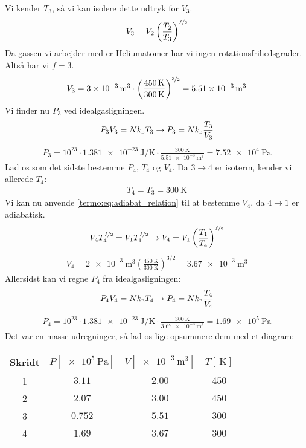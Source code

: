 \documentclass[crop=false, class=memoir]{standalone}
\begin{document}
Vi kender $T_3$, så vi kan isolere dette udtryk for $V_3$.
\begin{align}
    V_3 = V_2 \left( \frac{T_2}{T_3} \right)^{\nicefrac{f}{2}}
\end{align}
Da gassen vi arbejder med er Heliumatomer har vi ingen rotationsfrihedsgrader. Altså har vi $f = 3$.
\begin{align}
    V_3 = \SI{3e-3}{\cubic \meter} \cdot \left( \frac{\SI{450}{\kelvin}}{\SI{300}{\kelvin}} \right)^{\nicefrac{3}{2}} = \SI{5.51e-3}{\cubic \meter}
\end{align}
Vi finder nu $P_3$ ved idealgasligningen.
\begin{align}
    P_3 V_3 = N k_\textsc{b} T_3 \rightarrow P_3 = Nk_\textsc{b} \frac{T_3}{V_3}
\end{align}
\begin{align}
    P_3 = 10^{23} \cdot \SI{1.381e-23}{\joule \per \kelvin} \cdot \frac{\SI{300}{\kelvin}}{\SI{5.51e-3}{\cubic \meter}} = \SI{7.52e4}{\pascal}
\end{align}
Lad os som det sidste bestemme $P_4$, $T_4$ og $V_4$. Da $3\rightarrow 4$ er isoterm, kender vi allerede $T_4$:
\begin{align}
    T_4 = T_3 = \SI{300}{\kelvin}
\end{align}
Vi kan nu anvende \cref{termo:eq:adiabat_relation} til at bestemme $V_4$, da $4 \rightarrow 1$ er adiabatisk.
\begin{align}
    V_4 T_4^{\nicefrac{f}{2}} = V_1 T_1^{\nicefrac{f}{2}} \rightarrow V_4 = V_1 \left( \frac{T_1}{T_4} \right)^{\nicefrac{f}{2}}
\end{align}
\begin{align}
    V_4 = \SI{2e-3}{\cubic \meter} \left( \frac{\SI{450}{\kelvin}}{\SI{300}{\kelvin}} \right)^{3/2} = \SI{3.67e-3}{\cubic \meter}
\end{align}
Allersidst kan vi regne $P_4$ fra idealgasligningen:
\begin{align}
    P_4 V_4 = N k_\textsc{b} T_4 \rightarrow P_4 = Nk_\textsc{b} \frac{T_4}{V_4}
\end{align}
\begin{align}
    P_4 = 10^{23} \cdot \SI{1.381e-23}{\joule \per \kelvin} \cdot \frac{\SI{300}{\kelvin}}{\SI{3.67e-3}{\cubic \meter}} = \SI{1.69e5}{\pascal}
\end{align}
Det var en masse udregninger, så lad os lige opsummere dem med et diagram:
\begin{table}[H]
\centering
\begin{tabular}{|c|c|c|c|}
\hline
Skridt & $P \left[\SI{e5}{\pascal}\right]$ & $V \left[\SI{e-3}{\cubic \meter}\right]$ & $T \left[ \SI{}{\kelvin} \right]$ \\ \hline
1 & $3.11$ & $2.00$ & $450$ \\ \hline
2 & $2.07$ & $3.00$ &  $450$ \\ \hline
3 & $0.752$ & $5.51$ & $300$ \\ \hline
4 & $1.69$ & $3.67$ &  $300$ \\ \hline
\end{tabular}
\end{table}
\end{document}

